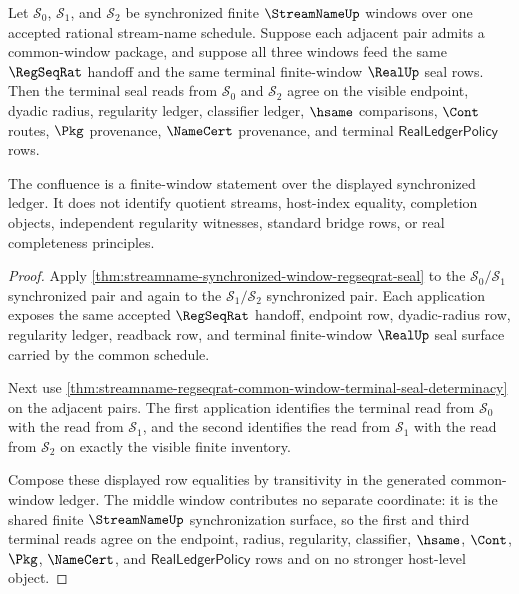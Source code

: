 \begin{theorem}
\label{thm:streamname-regseqrat-uniform-tail-seal-confluence}
Let $\mathcal S_0$, $\mathcal S_1$, and $\mathcal S_2$ be synchronized finite
$\StreamNameUp$ windows over one accepted rational stream-name schedule.
Suppose each adjacent pair admits a common-window package, and suppose all
three windows feed the same $\RegSeqRat$ handoff and the same terminal
finite-window $\RealUp$ seal rows. Then the terminal seal reads from
$\mathcal S_0$ and $\mathcal S_2$ agree on the visible endpoint, dyadic
radius, regularity ledger, classifier ledger, $\hsame$ comparisons, $\Cont$
routes, $\Pkg$ provenance, $\NameCert$ provenance, and terminal
$\mathsf{RealLedgerPolicy}$ rows.

The confluence is a finite-window statement over the displayed synchronized
ledger. It does not identify quotient streams, host-index equality, completion
objects, independent regularity witnesses, standard bridge rows, or real
completeness principles.
\end{theorem}
\begin{proof}
Apply \autoref{thm:streamname-synchronized-window-regseqrat-seal} to the
$\mathcal S_0/\mathcal S_1$ synchronized pair and again to the
$\mathcal S_1/\mathcal S_2$ synchronized pair. Each application exposes the
same accepted $\RegSeqRat$ handoff, endpoint row, dyadic-radius row,
regularity ledger, readback row, and terminal finite-window $\RealUp$ seal
surface carried by the common schedule.

Next use
\autoref{thm:streamname-regseqrat-common-window-terminal-seal-determinacy} on
the adjacent pairs. The first application identifies the terminal read from
$\mathcal S_0$ with the read from $\mathcal S_1$, and the second identifies
the read from $\mathcal S_1$ with the read from $\mathcal S_2$ on exactly the
visible finite inventory.

Compose these displayed row equalities by transitivity in the generated
common-window ledger. The middle window contributes no separate coordinate:
it is the shared finite $\StreamNameUp$ synchronization surface, so the first
and third terminal reads agree on the endpoint, radius, regularity,
classifier, $\hsame$, $\Cont$, $\Pkg$, $\NameCert$, and
$\mathsf{RealLedgerPolicy}$ rows and on no stronger host-level object.
\end{proof}

